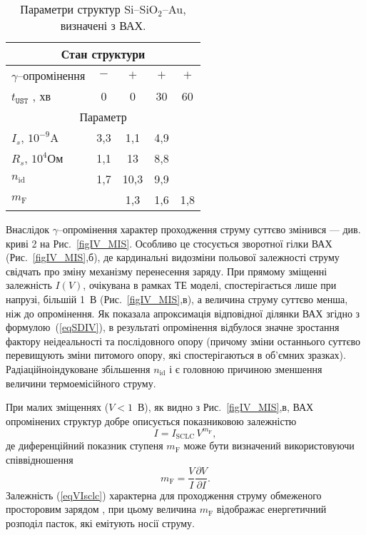 \documentclass[a4paper,14pt,oneside,openany]{memoir}
\begin{document}
\begin{table}
\caption{\label{tabMIS}Параметри структур Si--SiO$_2$--Au, визначені з ВАХ.
}
\center
\begin{tabular}{|l|c|c|c|c|}
\hline
\multicolumn{5}{|c|}{Стан структури}\\\hline
$\gamma$--опромінення&$-$&$+$&$+$&$+$\\ \hline
$t_\mathtt{UST}$ , хв&0&0&30&60\\ \hline
\multicolumn{5}{|c|}{Параметр}\\\hline
$I_s$, $10^{-9}$A & 3,3& 1,1& 4,9& \\ \hline
$R_s$, $10^{4}$Ом & 1,1& 13& 8,8& \\ \hline
$n_\mathrm{id}$ & 1,7& 10,3& 9,9& \\ \hline
$m_\mathrm{F}$ & &1,3& 1,6& 1,8 \\ \hline
\end{tabular}
\end{table}


Внаслідок $\gamma$--опромінення характер проходження струму суттєво змінився --- див. криві 2 на Рис.~\ref{figIV_MIS}.
Особливо це стосується зворотної гілки ВАХ (Рис.~\ref{figIV_MIS},б), де кардинальні видозміни польової залежності струму свідчать про зміну механізму перенесення заряду.
При прямому зміщенні залежність $I(V)$, очікувана в рамках ТЕ моделі, спостерігається лише при напрузі, більшій 1~В (Рис.~\ref{figIV_MIS},в), а величина струму суттєво менша, ніж до опромінення.
Як показала апроксимація відповідної ділянки ВАХ згідно з формулою~(\ref{eqSDIV}), в результаті опромінення відбулося значне  зростання фактору неідеальності та послідовного опору (причому зміни останнього суттєво перевищують зміни питомого опору, які спостерігаються в об'ємних зразках).
Радіаційноіндуковане збільшення $n_\mathrm{id}$ і є головною причиною зменшення величини термоемісійного струму.

При малих зміщеннях ($V<1$~В), як видно з Рис.~\ref{figIV_MIS},в, ВАХ опромінених структур добре описується показниковою залежністю
\begin{equation}\label{eqVIsclc}
  I=I_\mathrm{SCLC}\,V^{m_\mathrm{F}},
\end{equation}
де диференційний показник ступеня $m_\mathrm{F}$ може бути визначений використовуючи співвідношення
\begin{equation}\label{eqmsclc}
  m_\mathrm{F}=\frac{V}{I}\frac{\partial V}{\partial I}.
\end{equation}
Залежність (\ref{eqVIsclc}) характерна для проходження струму обмеженого просторовим зарядом \cite{MA2016,Jafar,SCLC:Kaya}, при цьому величина $m_\mathrm{F}$ відображає енергетичний розподіл пасток, які емітують носії струму.
\end{document}

